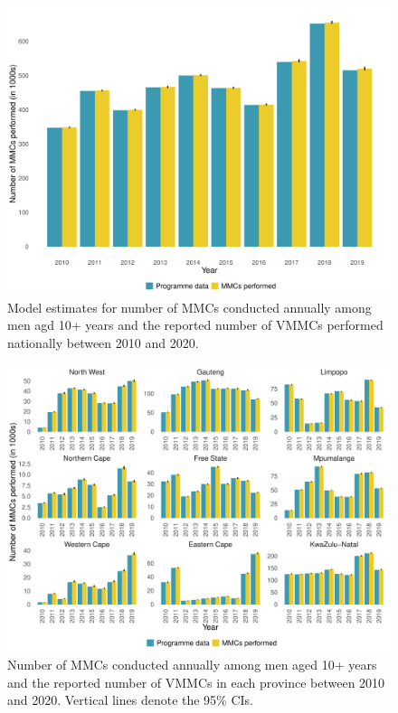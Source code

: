 \documentclass{article}
\begin{document}
\begin{appendix}
\begin{figure}[H]
	\centering
	\includegraphics[width = \linewidth]{Figures/suppmat/VMMCs/MMCsComparison_National}
	\caption{Model estimates for number of MMCs conducted annually among men agd 10+ years and the reported number of VMMCs performed nationally between 2010 and 2020.}
\end{figure}


\begin{figure}[H]
	\centering
	\includegraphics[width = \linewidth]{Figures/suppmat/VMMCs/MMCsComparison_Province}
	\caption{Number of MMCs conducted annually among men aged 10+ years and the reported number of VMMCs  in each province between 2010 and 2020. Vertical lines denote the 95\% CIs.}
\end{figure}	


\end{appendix}
\end{document}
